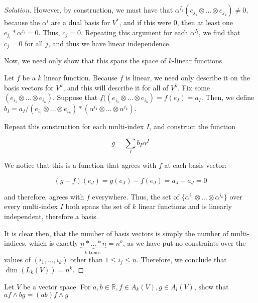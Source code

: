 \documentclass[10pt]{article}
\newenvironment{problem}[2][]{\begin{trivlist}
\item[\hskip \labelsep {\bfseries #1}\hskip \labelsep {\bfseries #2.}]}{\end{trivlist}}
\begin{document}
\begin{proof}[Solution]
However, by construction, we must have that $\alpha^{I_j} (e_{j_1} \otimes ... \otimes e_{j_k}) \neq 0$, because the $\alpha^i$ are a dual basis for $V^*$, and if this were 0, then at least one $e_{j_i} * \alpha^{j_i} = 0$. Thus, $c_j = 0$. Repeating this argument for each $\alpha^{I_l}$, we find that $c_j = 0$ for all $j$, and thus we have linear independence.

Now, we need only show that this spans the space of $k$-linear functions.

Let $f$ be a $k$ linear function. Because $f$ is linear, we need only describe it on the basis vectors for $V^k$, and this will describe it for all of $V^k$. Fix some $(e_{i_1}\otimes ... \otimes e_{i_k})$. Suppose that $f((e_{i_1}\otimes ... \otimes e_{i_k}) = f(e_I) = a_I$. Then, we define $b_I = a_I/ (e_{i_1}\otimes ... \otimes e_{i_k}) * (\alpha^{i_1} \otimes ... \otimes \alpha^{i_k})$.

Repeat this construction for each multi-index $I$, and construct the function

$$ g = \sum_I b_I \alpha^I$$

We notice that this is a function that agrees with $f$ at each basis vector:

$$ (g-f)(e_J) = g(e_J) - f(e_J) = a_J - a_J = 0$$

and therefore, agrees with $f$ everywhere. Thus, the set of  $\{ \alpha^{i_1} \otimes ... \otimes \alpha^{i_k} \}$ over every multi-index $I$ both spans the set of $k$ linear functions and is linearly independent, therefore a basis.

It is clear then, that the number of basis vectors is simply the number of multi-indices, which is exactly $\underbrace{n*...*n}_{k \text{ times }} = n^k $, as we have put no constraints over the values of $(i_1,...,i_k)$ other than $1 \leq i_j \leq n$. Therefore, we conclude that $\dim(L_k(V)) = n^k$.  

\end{proof}

\begin{problem}{Question 6}

Let $V$ be a vector space. For $a,b \in \mathbb{R}, f \in A_k(V), g \in A_l(V)$, show that $af \wedge bg = (ab) f \wedge g$
\end{problem}
\end{document}
